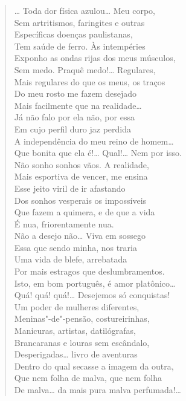 {\begin{verse}
\ldots{} Toda dor física azulou\ldots{} Meu corpo,\\
Sem artritismos, faringites e outras\\
Específicas doenças paulistanas,\\
Tem saúde de ferro. Às intempéries\\
Exponho as ondas rijas dos meus músculos,\\
Sem medo. Praquê medo!\ldots{} Regulares,\\
Mais regulares do que os meus, os traços\\
Do meu rosto me fazem desejado\\
Mais facilmente que na realidade\ldots{}\\
Já não falo por ela não, por essa\\
Em cujo perfil duro jaz perdida\\
A independência do meu reino de homem\ldots{}\\
Que bonita que ela é!\ldots{} Qual!\ldots{} Nem por isso.\\
Não sonho sonhos vãos. A realidade,\\
Mais esportiva de vencer, me ensina\\
Esse jeito viril de ir afastando\\
Dos sonhos vesperais os impossíveis\\
Que fazem a quimera, e de que a vida\\
É nua, friorentamente nua.\\
Não a desejo não\ldots{} Viva em sossego\\
Essa que sendo minha, nos traria\\
Uma vida de blefe, arrebatada\\
Por mais estragos que deslumbramentos.\\
Isto, em bom português, é amor platônico\ldots{}\\
Quá! quá! quá!\ldots{} Desejemos só conquistas!\\
Um poder de mulheres diferentes,\\
Meninas"-de"-pensão, costureirinhas,\\
Manicuras, artistas, datilógrafas,\\
Brancaranas e louras sem escândalo,\\
Desperigadas\ldots{} livro de aventuras\\
Dentro do qual secasse a imagem da outra,\\
Que nem folha de malva, que nem folha\\
De malva\ldots{} da mais pura malva perfumada!\ldots{}


\end{verse}}
